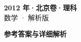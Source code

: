 \documentclass[zihao=-4, a4paper]{ctexart}
\begin{document}
\begin{center}
  {\Large\bfseries 2012 年·北京卷·理科}\\[4pt]
  {\large 数学 · 解析版}
\end{center}
\medskip
{}

\clearpage
{}
\begin{center}{\Large\bfseries 参考答案与详细解析}\end{center}
\medskip

\end{document}

